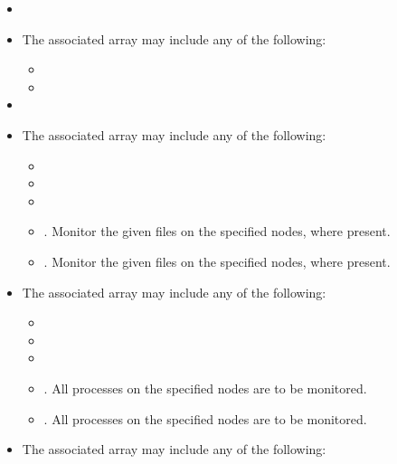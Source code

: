 \begin{itemize}
    \item {}
    \item {} The associated  array may include any of the following:
    \begin{itemize}
        \item {}
        \item {}
    \end{itemize}
    \item {}
    \item {} The associated  array may include any of the following:
    \begin{itemize}
        \item {}
        \item {}
        \item {}
        \item {}. Monitor the given files on the specified nodes, where present.
        \item {}. Monitor the given files on the specified nodes, where present.
    \end{itemize}
    \item {} The associated  array may include any of the following:
    \begin{itemize}
        \item {}
        \item {}
        \item {}
        \item {}. All processes on the specified nodes are to be monitored.
        \item {}. All processes on the specified nodes are to be monitored.
    \end{itemize}
    \item {} The associated  array may include any of the following:
    \begin{itemize}

\end{itemize}
\end{itemize}
